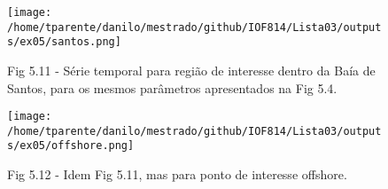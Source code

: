 \documentclass[11pt]{article}
\makeatletter
\def\maxwidth{\ifdim\Gin@nat@width>\linewidth\linewidth
    \else\Gin@nat@width\fi}
\let\Oldincludegraphics\includegraphics
\renewcommand{\includegraphics}[1]{\Oldincludegraphics[width=.8\maxwidth]{#1}}
\makeatother
\begin{document}
\begin{figure}[!ht]
\centering
\centerline{\hbox{\texttt{[image: /home/tparente/danilo/mestrado/github/IOF814/Lista03/outputs/ex05/santos.png]}}}
\caption{Fig 5.11 - Série temporal para região de interesse dentro da Baía de Santos, para os mesmos parâmetros apresentados na Fig 5.4.}
\label{fig5:9}
\end{figure}

\begin{figure}[!ht]
\centering
\centerline{\hbox{\texttt{[image: /home/tparente/danilo/mestrado/github/IOF814/Lista03/outputs/ex05/offshore.png]}}}
\caption{Fig 5.12 - Idem Fig 5.11, mas para ponto de interesse offshore.}
\label{fig5:12}
\end{figure}




    
\end{document}
